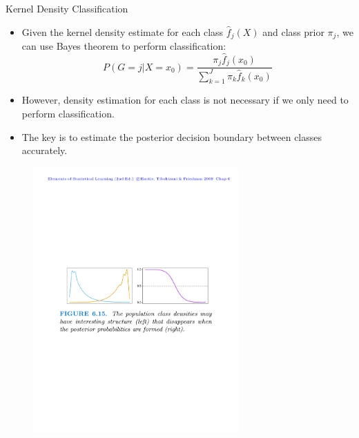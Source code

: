 \documentclass{beamer}
\begin{document}
\begin{frame}{Kernel Density Classification}
    \begin{itemize}
        \item Given the kernel density estimate for each class $\hat{f}_j(X)$ and class prior $\pi_j$, we can use Bayes theorem to perform classification:
        \begin{equation*}
            P(G=j|X=x_0) = \frac{\pi_j \hat{f}_j(x_0)}{\sum_{k=1}^J\pi_k \hat{f}_k(x_0)}
        \end{equation*}
        \item However, density estimation for each class is not necessary if we only need to perform classification.
        \item The key is to estimate the posterior decision boundary between classes accurately.
    \end{itemize}
    \begin{figure}
        \centering
        \includegraphics[width=0.7\textwidth]{figures/classdensities.pdf}
    \end{figure}
\end{frame}
\end{document}
